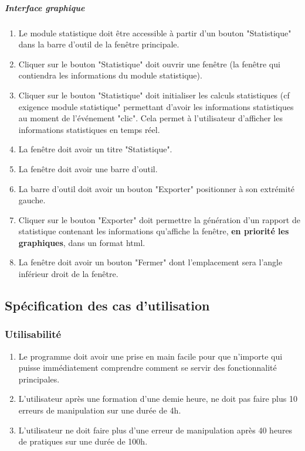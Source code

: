 \documentclass[10pt,a4paper]{report}
\begin{document}
	\subparagraph{Interface graphique}
	
		\begin{enumerate}

			\item Le module statistique doit être accessible à partir d'un bouton "Statistique" dans la barre d'outil de la fenêtre principale.

			\item Cliquer sur le bouton "Statistique" doit ouvrir une fenêtre (la fenêtre qui contiendra les informations du module statistique).

			\item Cliquer sur le bouton "Statistique" doit initialiser les calculs statistiques (cf exigence module statistique" permettant d'avoir les informations statistiques au moment de l'événement "clic". Cela permet à l'utilisateur d'afficher les informations statistiques en temps réel.

			\item La fenêtre doit avoir un titre "Statistique".

			\item La fenêtre doit avoir une barre d'outil.
	
			\item La barre d'outil doit avoir un bouton "Exporter" positionner à son extrémité gauche.

			\item Cliquer sur le bouton "Exporter" doit permettre la génération d'un rapport de statistique contenant les informations qu'affiche la fenêtre, \textbf{en priorité les graphiques}, dans un format html.

			\item La fenêtre doit avoir un bouton "Fermer" dont l'emplacement sera l'angle inférieur droit de la fenêtre. 

		\end{enumerate}
	

\subsection{Spécification des cas d’utilisation}


\subsubsection{Utilisabilité}
	\begin{enumerate}
		\item Le programme doit avoir une prise en main facile pour que n'importe qui puisse immédiatement comprendre comment se servir des fonctionnalité principales.
		\item L'utilisateur après une formation d'une demie heure, ne doit pas faire plus 10 erreurs de manipulation sur une durée de 4h.
		\item L'utilisateur ne doit faire plus d'une erreur de manipulation après 40 heures de pratiques sur une durée de 100h.
	\end{enumerate}
\end{document}
